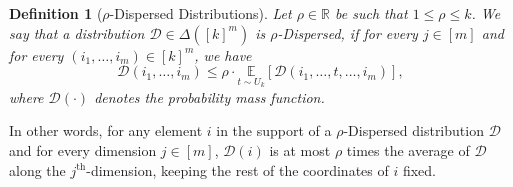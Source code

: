 \documentclass[10pt,a4paper]{article}
\newtheorem{definition}{Definition}[section]
\newcommand{\sD}{\mathcal{D}}
\begin{document}
\begin{definition}[$\rho$-Dispersed Distributions]\label{def:dispersed}
    Let $\rho\in \mathbb{R}$ be such that $1 \leq \rho \leq k$. We say that a distribution $\sD\in \Delta([k]^{m})$ is $\rho$-Dispersed, if for every $j\in [m]$ and for every $(i_1, \dots, i_m) \in [k]^{m}$, we have 
    \begin{equation*}
        \sD(i_1, \dots, i_m) \leq \rho \cdot \underset{t\sim U_{k}}{\mathbb{E}}[\sD(i_1, \dots, t, \dots, i_m)],
    \end{equation*}
    where $\sD(\cdot)$ denotes the probability mass function.
    
\end{definition}
In other words, for any element $i$ in the support of a $\rho$-Dispersed distribution $\sD$ and for every dimension $j \in [m]$, $\sD(i)$ is at most $\rho$ times the average of $\sD$ along the $j^{\text{th}}$-dimension, keeping the rest of the coordinates of $i$ fixed. 
\end{document}
